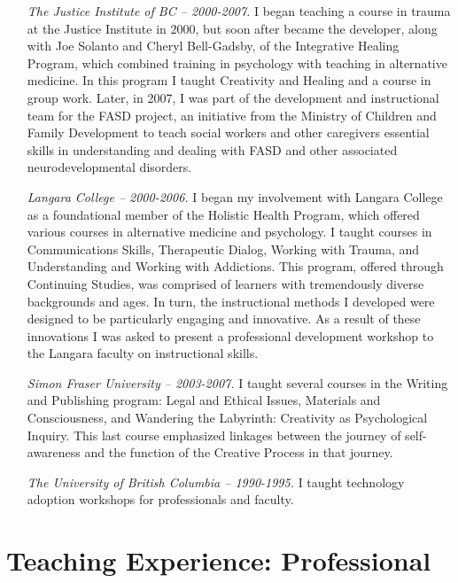 \documentclass[10pt,DIV09,letterpaper,oneside,headsepline]{scrreprt}
\begin{document}
\begin{itemize}
\item [\textit{The Justice Institute of BC -- 2000-2007.}] I began teaching a course in trauma at the Justice Institute in 2000, but soon after became the developer, along with Joe Solanto and Cheryl Bell-Gadsby, of the Integrative Healing Program, which combined training in psychology with teaching in alternative medicine. In this program I taught Creativity and Healing and a course in group work. Later, in 2007, I was part of the development and instructional team for the FASD project, an initiative from the Ministry of Children and Family Development to teach social workers and other caregivers essential skills in understanding and dealing with FASD and other associated neurodevelopmental disorders.

\item [\textit{Langara College -- 2000-2006.}] I began my involvement with Langara College as a foundational member of the Holistic Health Program, which offered various courses in alternative medicine and psychology. I taught courses in Communications Skills, Therapeutic Dialog, Working with Trauma, and Understanding and Working with Addictions. This program, offered through Continuing Studies, was comprised of learners with tremendously diverse backgrounds and ages. In turn, the instructional methods I developed were designed to be particularly engaging and innovative. As a result of these innovations I was asked to present a professional development workshop to the Langara faculty on instructional skills.

\item [\textit{Simon Fraser University -- 2003-2007.}] I taught several courses in the Writing and Publishing program: Legal and Ethical Issues, Materials and Consciousness, and Wandering the Labyrinth: Creativity as Psychological Inquiry. This last course emphasized linkages between the  journey of self-awareness and the function of the Creative Process in that journey.

\item [\textit{The University of British Columbia -- 1990-1995.}]
I taught technology adoption workshops for professionals and faculty.


\end{itemize}

\chapter{Teaching Experience: Professional}
\end{document}
